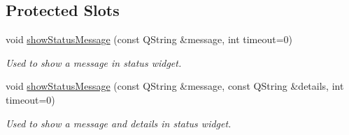 \subsection*{Protected Slots}
\begin{DoxyCompactItemize}
\item 
void \hyperlink{classmdt_abstract_port_setup_dialog_a93809d1ae18b5580eeebf15c561bc89f}{showStatusMessage} (const QString \&message, int timeout=0)
\begin{DoxyCompactList}\small\item\em Used to show a message in status widget. \end{DoxyCompactList}\item 
void \hyperlink{classmdt_abstract_port_setup_dialog_aa7f429788e0a6ab9d635afa126480e2d}{showStatusMessage} (const QString \&message, const QString \&details, int timeout=0)
\begin{DoxyCompactList}\small\item\em Used to show a message and details in status widget. \end{DoxyCompactList}\end{DoxyCompactItemize}
